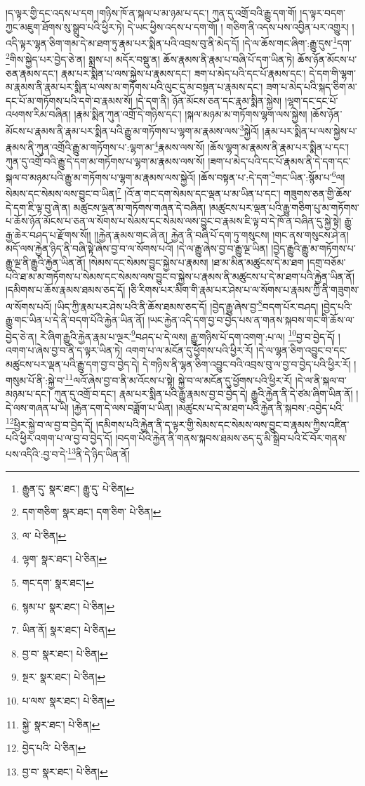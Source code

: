 །ད་ལྟར་གྱི་དང་འདས་པ་དག །གཉིས་ཁོ་ན་སྐལ་པ་མ་ཉམ་པ་དང་། ཀུན་དུ་འགྲོ་བའི་རྒྱུ་དག་གོ། །ད་ལྟར་བདག་ཀྱང་མཇུག་ཐོགས་སུ་སྒྲུབ་པའི་ཕྱིར་ཏེ། དེ་ཡང་ཕྱིས་འདས་པ་དག་གོ། །
གཅིག་ནི་འདས་པས་འབྱིན་པར་འགྱུར། །འདི་ལྟར་ལྷན་ཅིག་གམ་དེ་མ་ཐག་ཏུ་རྣམ་པར་སྨིན་པའི་འབྲས་བུ་ནི་མེད་དོ། །དེ་ལ་ཆོས་གང་ཞིག་:རྒྱུ་དུས་\footnote{རྒྱུན་དུ་  སྣར་ཐང་། རྒྱུ་དུ་  པེ་ཅིན། }དག་\footnote{དག་གཅིག་  སྣར་ཐང་། དག་ཅིག་  པེ་ཅིན། }གིས་སྐྱེད་པར་བྱེད་ཅེ་ན། སྨྲས་པ། མདོར་བསྡུ་ན། ཆོས་རྣམས་ནི་རྣམ་པ་བཞི་པོ་དག་ཡིན་ཏེ། ཆོས་ཉོན་མོངས་པ་ཅན་རྣམས་དང་། རྣམ་པར་སྨིན་པ་ལས་སྐྱེས་པ་རྣམས་དང་། ཟག་པ་མེད་པའི་དང་པོ་རྣམས་དང་། དེ་དག་གི་ལྷག་མ་རྣམས་ནི་རྣམ་པར་སྨིན་པ་ལས་མ་གཏོགས་པའི་ལུང་དུ་མ་བསྟན་པ་རྣམས་དང་། ཟག་པ་མེད་པའི་སྐད་ཅིག་མ་དང་པོ་མ་གཏོགས་པའི་དགེ་བ་རྣམས་སོ། །དེ་དག་ནི། ཉོན་མོངས་ཅན་དང་རྣམ་སྨིན་སྐྱེས། །ལྷག་དང་དང་པོ་འཕགས་རིམ་བཞིན། །རྣམ་སྨིན་ཀུན་འགྲོ་དེ་གཉིས་དང་། །སྐལ་མཉམ་མ་གཏོགས་ལྷག་ལས་སྐྱེས། །ཆོས་ཉོན་མོངས་པ་རྣམས་ནི་རྣམ་པར་སྨིན་པའི་རྒྱུ་མ་གཏོགས་པ་ལྷག་མ་རྣམས་ལས་\footnote{ལ་  པེ་ཅིན། }སྐྱེའོ། །རྣམ་པར་སྨིན་པ་ལས་སྐྱེས་པ་རྣམས་ནི་ཀུན་འགྲོའི་རྒྱུ་མ་གཏོགས་པ་:ལྷག་མ་\footnote{ལྷག་  སྣར་ཐང་།  པེ་ཅིན། }རྣམས་ལས་སོ། །ཆོས་ལྷག་མ་རྣམས་ནི་རྣམ་པར་སྨིན་པ་དང་། ཀུན་དུ་འགྲོ་བའི་རྒྱུ་དེ་དག་མ་གཏོགས་པ་ལྷག་མ་རྣམས་ལས་སོ། །ཟག་པ་མེད་པའི་དང་པོ་རྣམས་ནི་དེ་དག་དང་སྐལ་བ་མཉམ་པའི་རྒྱུ་མ་གཏོགས་པ་ལྷག་མ་རྣམས་ལས་སྐྱེའོ། །ཆོས་བསྟན་པ་:དེ་དག་\footnote{གང་དག་  སྣར་ཐང་། }གང་ཡིན་:སྙོམ་པ་\footnote{སྙམ་པ་  སྣར་ཐང་།  པེ་ཅིན། }ལ། སེམས་དང་སེམས་ལས་བྱུང་བ་ཡིན།\footnote{ཡིན་ནོ།  སྣར་ཐང་།  པེ་ཅིན། } །འོ་ན་གང་དག་སེམས་དང་ལྡན་པ་མ་ཡིན་པ་དང་། གཟུགས་ཅན་གྱི་ཆོས་དེ་དག་ཇི་ལྟ་བུ་ཞེ་ན། མཚུངས་ལྡན་མ་གཏོགས་གཞན་དེ་བཞིན། །མཚུངས་པར་ལྡན་པའི་རྒྱུ་གཅིག་པུ་མ་གཏོགས་པ་ཆོས་ཉོན་མོངས་པ་ཅན་ལ་སོགས་པ་སེམས་དང་སེམས་ལས་བྱུང་བ་རྣམས་ཇི་ལྟ་བ་དེ་ཁོ་ན་བཞིན་དུ་སྐྱེ་སྟེ། རྒྱུ་རྒྱ་ཆེར་བཤད་པ་རྫོགས་སོ།། །།རྐྱེན་རྣམས་གང་ཞེ་ན། རྐྱེན་ནི་བཞི་པོ་དག་ཏུ་གསུངས། །གང་ནས་གསུངས་ཤེ་ན། མདོ་ལས་རྐྱེན་ཉིད་ནི་བཞི་སྟེ་ཞེས་བྱ་བ་ལ་སོགས་པའོ། །དེ་ལ་རྒྱུ་ཞེས་བྱ་བ་རྒྱུ་ལྔ་ཡིན། །བྱེད་རྒྱུའི་རྒྱུ་མ་གཏོགས་པ་རྒྱུ་ལྔ་ནི་རྒྱུའི་རྐྱེན་ཡིན་ནོ། །སེམས་དང་སེམས་བྱུང་སྐྱེས་པ་རྣམས། །ཐ་མ་མིན་མཚུངས་དེ་མ་ཐག །དགྲ་བཅོམ་པའི་ཐ་མ་མ་གཏོགས་པ་སེམས་དང་སེམས་ལས་བྱུང་བ་སྐྱེས་པ་རྣམས་ནི་མཚུངས་པ་དེ་མ་ཐག་པའི་རྐྱེན་ཡིན་ནོ། །དམིགས་པ་ཆོས་རྣམས་ཐམས་ཅད་དོ། །ཅི་རིགས་པར་མིག་གི་རྣམ་པར་ཤེས་པ་ལ་སོགས་པ་རྣམས་ཀྱི་ནི་གཟུགས་ལ་སོགས་པའོ། །ཡིད་ཀྱི་རྣམ་པར་ཤེས་པའི་ནི་ཆོས་ཐམས་ཅད་དོ། །བྱེད་རྒྱུ་ཞེས་བྱ་\footnote{བྱ་བ་  སྣར་ཐང་།  པེ་ཅིན། }བདག་པོར་བཤད། །བྱེད་པའི་རྒྱུ་གང་ཡིན་པ་དེ་ནི་བདག་པོའི་རྐྱེན་ཡིན་ནོ། །ཡང་རྐྱེན་འདི་དག་བྱ་བ་བྱེད་པས་ན་གནས་སྐབས་གང་གི་ཆོས་ལ་བྱེད་ཅེ་ན། རེ་ཞིག་རྒྱུའི་རྐྱེན་རྣམ་པ་ལྔར་\footnote{སྔར་  སྣར་ཐང་།  པེ་ཅིན། }བཤད་པ་དེ་ལས། རྒྱུ་གཉིས་པོ་དག་འགག་:པ་ལ། \footnote{པ་ལས་  སྣར་ཐང་།  པེ་ཅིན། }བྱ་བ་བྱེད་དོ། །འགག་པ་ཞེས་བྱ་བ་ནི་ད་ལྟར་ཡིན་ཏེ། འགག་པ་ལ་མངོན་དུ་ཕྱོགས་པའི་ཕྱིར་རོ། །དེ་ལ་ལྷན་ཅིག་འབྱུང་བ་དང་མཚུངས་པར་ལྡན་པའི་རྒྱུ་དག་བྱ་བ་བྱེད་དེ། དེ་གཉིས་ནི་ལྷན་ཅིག་འབྱུང་བའི་འབྲས་བུ་ལ་བྱ་བ་བྱེད་པའི་ཕྱིར་རོ། །གསུམ་པོ་ནི་:སྐྱེ་བ་\footnote{སྐྱེ་  སྣར་ཐང་།  པེ་ཅིན། }ལའོ་ཞེས་བྱ་བ་ནི་མ་འོངས་པ་སྟེ། སྐྱེ་བ་ལ་མངོན་དུ་ཕྱོགས་པའི་ཕྱིར་རོ། །དེ་ལ་ནི་སྐལ་བ་མཉམ་པ་དང་། ཀུན་དུ་འགྲོ་བ་དང་། རྣམ་པར་སྨིན་པའི་རྒྱུ་རྣམས་བྱ་བ་བྱེད་དེ། རྒྱུའི་རྐྱེན་ནི་དེ་ཙམ་ཞིག་ཡིན་ནོ། །དེ་ལས་གཞན་པ་ཡི། །རྐྱེན་དག་དེ་ལས་བཟློག་པ་ཡིན། །མཚུངས་པ་དེ་མ་ཐག་པའི་རྐྱེན་ནི་སྐབས་:འབྱེད་པའི་\footnote{བྱེད་པའི་  པེ་ཅིན། }ཕྱིར་སྐྱེ་བ་ལ་བྱ་བ་བྱེད་དོ། །དམིགས་པའི་རྐྱེན་ནི་ད་ལྟར་གྱི་སེམས་དང་སེམས་ལས་བྱུང་བ་རྣམས་ཀྱིས་འཛིན་པའི་ཕྱིར་འགག་པ་ལ་བྱ་བ་བྱེད་དོ། །བདག་པོའི་རྐྱེན་ནི་གནས་སྐབས་ཐམས་ཅད་དུ་མི་སྒྲིབ་པའི་ངོ་བོར་གནས་པས་འདིའི་:བྱ་བ་དེ་\footnote{བྱ་བ་  སྣར་ཐང་།  པེ་ཅིན། }ནི་དེ་ཉིད་ཡིན་ནོ། 